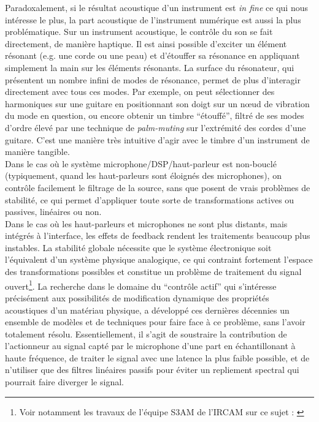 \noindent Paradoxalement, si le résultat acoustique d'un instrument est \textit{in fine} ce qui nous intéresse le plus, la part acoustique de l'instrument numérique est aussi la plus problématique. Sur un instrument acoustique, le contrôle du son se fait directement, de manière haptique. Il est ainsi possible d'exciter un élément résonant (e.g. une corde ou une peau) et d'étouffer sa résonance en appliquant simplement la main sur les éléments résonants. La surface du résonateur, qui présentent un nombre infini de modes de résonance, permet de plus d'interagir directement avec tous ces modes. Par exemple, on peut sélectionner des harmoniques sur une guitare en positionnant son doigt sur un nœud de vibration du mode en question, ou encore obtenir un timbre ``étouffé'', filtré de ses modes d'ordre élevé par une technique de \textit{palm-muting} sur l'extrémité des cordes d'une guitare. C'est une manière très intuitive d'agir avec le timbre d'un instrument de manière tangible.\\
\indent Dans le cas où le système microphone/DSP/haut-parleur est non-bouclé (typiquement, quand les haut-parleurs sont éloignés des microphones), on contrôle facilement le filtrage de la source, sans que posent de vrais problèmes de stabilité, ce qui permet d'appliquer toute sorte de transformations actives ou passives, linéaires ou non.\\
\indent Dans le cas où les haut-parleurs et microphones ne sont plus distants, mais intégrés à l'interface, les effets de feedback rendent les traitements beaucoup plus instables. La stabilité globale nécessite que le système électronique soit l'équivalent d'un système physique analogique\cite{berdahl_feedback_2012}, ce qui contraint fortement l'espace des transformations possibles et constitue un problème de traitement du signal ouvert\footnote{Voir notamment les travaux de l'équipe S3AM de l'\gls{IRCAM} sur ce sujet : \cite{muller_power-balanced_2018, falaize_modelisation_2014, muller_minimal_2019}}. La recherche dans le domaine du ``contrôle actif'' qui s'intéresse précisément aux possibilités de modification dynamique des propriétés acoustiques d'un matériau physique, a développé ces dernières décennies un ensemble de modèles \cite{boutin_active_2011, benacchio_mode_2015, meurisse_active_2015, pardue_separating_2019} et de techniques pour faire face à ce problème, sans l'avoir totalement résolu. Essentiellement, il s'agit de soustraire la contribution de l'actionneur au signal capté par le microphone d'une part en échantillonant à haute fréquence, de traiter le signal avec une latence la plus faible possible, et de n'utiliser que des filtres linéaires passifs pour éviter un repliement spectral qui pourrait faire diverger le signal.\\
